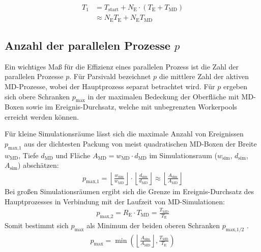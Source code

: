 \begin{align}
  T_1 & = T_\text{start} + N_\text{E} \cdot (T_\text{E} + T_\text{MD}) \\
      & \approx N_\text{E} T_\text{E} + N_\text{E} T_\text{MD}
\end{align}

\subsection{Anzahl der parallelen Prozesse $p$}

Ein wichtiges Maß für die Effizienz eines parallelen Prozess ist die Zahl der parallelen Prozesse $p$.
Für Parsivald bezeichnet $p$ die mittlere Zahl der aktiven MD-Prozesse, wobei der Hauptprozess separat betrachtet wird.
Für $p$ ergeben sich obere Schranken $p_\text{max}$ in der maximalen Bedeckung der Oberfläche mit MD-Boxen sowie im Ereignis-Durchsatz, welche mit unbegrenzten Workerpools erreicht werden können.

Für kleine Simulationsräume lässt sich die maximale Anzahl von Ereignissen $p_\text{max,1}$ aus der dichtesten Packung von meist quadratischen MD-Boxen der Breite $w_\text{MD}$, Tiefe $d_\text{MD}$ und Fläche $A_\text{MD} = w_\text{MD} \cdot d_\text{MD}$ im Simulationsraum ($w_\text{sim}$, $d_\text{sim}$, $A_\text{sim}$) abschätzen:
\begin{align}
  p_\text{max,1} = \left\lfloor\frac{w_\text{sim}}{w_\text{MD}}\right\rfloor \cdot \left\lfloor\frac{d_\text{sim}}{d_\text{MD}}\right\rfloor
                 \approx \left\lfloor\frac{A_\text{sim}}{A_\text{MD}}\right\rfloor
\end{align}
Bei großen Simulationsräumen ergibt sich die Grenze im Ereignis-Durchsatz des Hauptprozesses in Verbindung mit der Laufzeit von MD-Simulationen:
\begin{align}
  p_\text{max,2} = R_\text{E} \cdot T_\text{MD}
                 = \frac{T_\text{MD}}{T_\text{E}}
\end{align}
Somit bestimmt sich $p_\text{max}$ als Minimum der beiden oberen Schranken $p_\text{max,1/2}$ .
\begin{align}
  p_\text{max} = \min\left(\left\lfloor\frac{A_\text{sim}}{A_\text{MD}}\right\rfloor, \frac{T_\text{MD}}{T_\text{E}}\right)
\end{align}

